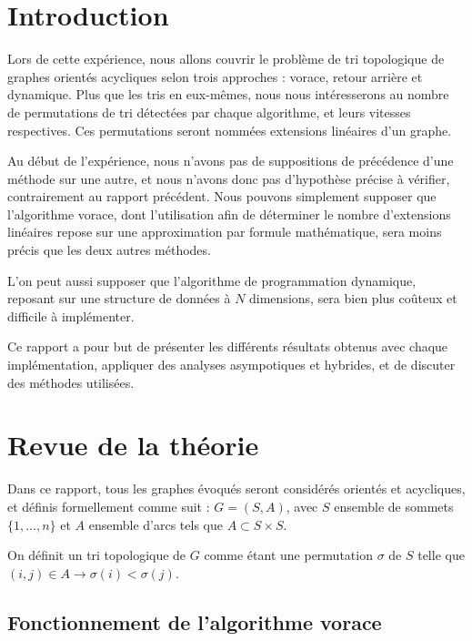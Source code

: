 \documentclass[10pt,a4paper]{article}
\begin{document}
\newpage

\hfill

\newpage

\tableofcontents

\newpage

\section{Introduction}

Lors de cette expérience, nous allons couvrir le problème de tri topologique de graphes orientés acycliques selon trois approches : vorace, retour arrière et dynamique. Plus que les tris en eux-mêmes, nous nous intéresserons au nombre de permutations de tri détectées par chaque algorithme, et leurs vitesses respectives. Ces permutations seront nommées \og extensions linéaires \fg d'un graphe.

Au début de l'expérience, nous n'avons pas de suppositions de précédence d'une méthode sur une autre, et nous n'avons donc pas d'hypothèse précise à vérifier, contrairement au rapport précédent. Nous pouvons simplement supposer que l'algorithme vorace, dont l'utilisation afin de déterminer le nombre d'extensions linéaires repose sur une approximation par formule mathématique, sera moins précis que les deux autres méthodes.

L'on peut aussi supposer que l'algorithme de programmation dynamique, reposant sur une structure de données à $N$ dimensions, sera bien plus coûteux et difficile à implémenter.

Ce rapport a pour but de présenter les différents résultats obtenus avec chaque implémentation, appliquer des analyses asympotiques et hybrides, et de discuter des méthodes utilisées.

\section{Revue de la théorie}

Dans ce rapport, tous les graphes évoqués seront considérés orientés et acycliques, et définis formellement comme suit : $ G = (S,A) $, avec $S$ ensemble de sommets $\{1, \ldots, n\}$ et $A$ ensemble d'arcs tels que $ A \subset S \times S $.

On définit un tri topologique de $G$ comme étant une permutation $ \sigma $ de $ S $ telle que $ (i,j) \in A \longrightarrow \sigma(i) < \sigma(j) $.

\subsection{Fonctionnement de l'algorithme vorace}
\end{document}
